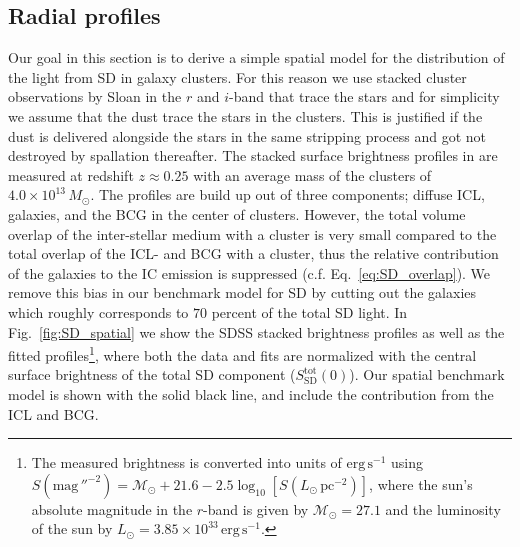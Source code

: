 \documentclass[10pt,aps,pra,reprint,amsmath,amsfonts,amssymb,showpacs,nofootinbib,floatfix]{revtex4-1}
\newcommand{\rmn}{\mathrm}
\newcommand{\sd}{\rmn{SD}}
\newcommand{\msun}{M_\odot}
\begin{document}
\subsection{Radial profiles}
\label{sect:SD_radial}
Our goal in this section is to derive a simple spatial model for the
distribution of the light from SD in galaxy clusters. For this reason
we use stacked cluster observations by Sloan in the $r$ and $i$-band
that trace the stars and for simplicity we assume that the dust trace
the stars in the clusters. This is justified if the dust is delivered
alongside the stars in the same stripping process and got not
destroyed by spallation thereafter. The stacked surface brightness
profiles in \cite{2005MNRAS.358..949Z} are measured at redshift $z
\approx 0.25$ with an average mass of the clusters of
$4.0\times10^{13}\,\msun$. The profiles are build up out of three
components; diffuse ICL, galaxies, and the BCG in the center of
clusters. However, the total volume overlap of the inter-stellar
medium with a cluster is very small compared to the total overlap of
the ICL- and BCG with a cluster, thus the relative contribution of the
galaxies to the IC emission is suppressed
(c.f. Eq.~\ref{eq:SD_overlap}). We remove this bias in our benchmark
model for SD by cutting out the galaxies which roughly corresponds to
$70$ percent of the total SD light. In Fig.~\ref{fig:SD_spatial} we
show the SDSS stacked brightness profiles as well as the fitted
profiles\footnote{The measured brightness is converted into units of
  $\rmn{erg}\,\rmn{s}^{-1}$ using \cite{2010...book}
  $S(\rmn{mag}\,''^{-2}) =
  \mathcal{M}_\odot+21.6-2.5\log_{10}[S(L_\odot\,\rmn{pc}^{-2})]$,
  where the sun's absolute magnitude in the $r$-band is given by
  $\mathcal{M}_\odot=27.1$ \cite{1998gaas.book.....B} and the
  luminosity of the sun by $L_\odot=3.85\times10^{33}\,
  \rmn{erg}\,\rmn{s}^{-1}$.}, where both the data and fits are
normalized with the central surface brightness of the total SD
component ($S_\sd^\rmn{tot}(0)$). Our spatial benchmark model is shown
with the solid black line, and include the contribution from the ICL
and BCG.
\end{document}
